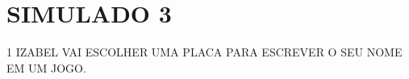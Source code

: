 \chapter{SIMULADO 3}

\num{1} IZABEL VAI ESCOLHER UMA PLACA PARA ESCREVER O SEU NOME EM UM JOGO.





